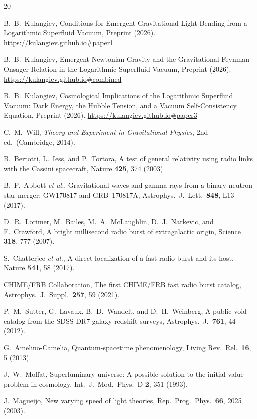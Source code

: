 \documentclass[12pt, a4paper]{article}
\begin{document}
\begin{thebibliography}{20}

B.~B.~Kulangiev,
Conditions for Emergent Gravitational Light Bending from a Logarithmic Superfluid Vacuum,
Preprint (2026).
\url{https://kulangiev.github.io#paper1}

B.~B.~Kulangiev,
Emergent Newtonian Gravity and the Gravitational Feynman-Onsager Relation in the Logarithmic Superfluid Vacuum,
Preprint (2026).
\url{https://kulangiev.github.io#combined}

B.~B.~Kulangiev,
Cosmological Implications of the Logarithmic Superfluid Vacuum: Dark Energy, the Hubble Tension, and a Vacuum Self-Consistency Equation,
Preprint (2026).
\url{https://kulangiev.github.io#paper3}

C.~M.~Will,
\emph{Theory and Experiment in Gravitational Physics},
2nd ed.\ (Cambridge, 2014).

B.~Bertotti, L.~Iess, and P.~Tortora,
A test of general relativity using radio links with
the Cassini spacecraft,
Nature \textbf{425}, 374 (2003).

B.~P.~Abbott \emph{et al.},
Gravitational waves and gamma-rays from a binary
neutron star merger: GW170817 and GRB~170817A,
Astrophys.\ J.\ Lett.\ \textbf{848}, L13 (2017).

D.~R.~Lorimer, M.~Bailes, M.~A.~McLaughlin,
D.~J.~Narkevic, and F.~Crawford,
A bright millisecond radio burst of extragalactic
origin,
Science \textbf{318}, 777 (2007).

S.~Chatterjee \emph{et al.},
A direct localization of a fast radio burst and its
host,
Nature \textbf{541}, 58 (2017).

CHIME/FRB Collaboration,
The first CHIME/FRB fast radio burst catalog,
Astrophys.\ J.\ Suppl.\ \textbf{257}, 59 (2021).

P.~M.~Sutter, G.~Lavaux, B.~D.~Wandelt, and
D.~H.~Weinberg,
A public void catalog from the SDSS DR7 galaxy
redshift surveys,
Astrophys.\ J.\ \textbf{761}, 44 (2012).

G.~Amelino-Camelia,
Quantum-spacetime phenomenology,
Living Rev.\ Rel.\ \textbf{16}, 5 (2013).

J.~W.~Moffat,
Superluminary universe: A possible solution to the
initial value problem in cosmology,
Int.\ J.\ Mod.\ Phys.\ D \textbf{2}, 351 (1993).

J.~Magueijo,
New varying speed of light theories,
Rep.\ Prog.\ Phys.\ \textbf{66}, 2025 (2003).

\end{thebibliography}
\end{document}
